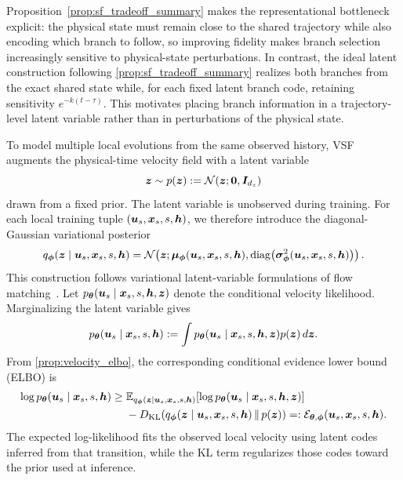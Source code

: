 \documentclass{article} %
\numberwithin{equation}{section}
\begin{document}
Proposition~\ref{prop:sf_tradeoff_summary} makes the representational
bottleneck explicit: the physical state must remain close to the shared
trajectory while also encoding which branch to follow, so improving fidelity
makes branch selection increasingly sensitive to physical-state perturbations.
In contrast, the ideal latent construction following
\cref{prop:sf_tradeoff_summary} realizes both branches from the
exact shared state while, for each fixed latent branch code, retaining
sensitivity $e^{-k(t-\tau)}$. This motivates placing branch information in a
trajectory-level latent variable rather than in perturbations of the physical
state.

To model multiple local evolutions from the same observed history, VSF
augments the physical-time velocity field with a latent variable
\begin{equation}
    {\bm{z}}\sim p({\bm{z}})
    :=
    \mathcal N({\bm{z}};{\bm{0}},{\bm{I}}_{d_z})
    \label{eq:latent_prior}
\end{equation}
drawn from a fixed prior. The latent variable is unobserved during training.
For each local training tuple $({\bm{u}}_s,{\bm{x}}_s,s,{\bm{h}})$, we therefore introduce
the diagonal-Gaussian variational posterior
\begin{equation}
    q_{\boldsymbol{\phi}}({\bm{z}}\mid{\bm{u}}_s,{\bm{x}}_s,s,{\bm{h}})
    =
    \mathcal N\!\left(
        {\bm{z}};
        {\bm{\mu}}_{\boldsymbol{\phi}}({\bm{u}}_s,{\bm{x}}_s,s,{\bm{h}}),
        \operatorname{diag}\!\left(
            \boldsymbol{\sigma}_{\boldsymbol{\phi}}^2({\bm{u}}_s,{\bm{x}}_s,s,{\bm{h}})
        \right)
    \right).
    \label{eq:vsf_variational_posterior}
\end{equation}
This construction follows variational latent-variable formulations of flow
matching~\citep{guo2025variational,eijkelboom2024variational}. Let
$p_{{\bm{\theta}}}({\bm{u}}_s\mid{\bm{x}}_s,s,{\bm{h}},{\bm{z}})$ denote the conditional velocity
likelihood. Marginalizing the latent variable gives
\begin{equation}
    p_{{\bm{\theta}}}({\bm{u}}_s\mid{\bm{x}}_s,s,{\bm{h}})
    :=
    \int
    p_{{\bm{\theta}}}({\bm{u}}_s\mid{\bm{x}}_s,s,{\bm{h}},{\bm{z}})
    p({\bm{z}})\,d{\bm{z}}.
    \label{eq:vsf_velocity_evidence}
\end{equation}
From \cref{prop:velocity_elbo}, the corresponding conditional evidence lower bound (ELBO) is
\begin{align}
    \log p_{{\bm{\theta}}}({\bm{u}}_s\mid{\bm{x}}_s,s,{\bm{h}})
    \geq{}&
    \mathbb{E}_{q_{\boldsymbol{\phi}}({\bm{z}}\mid{\bm{u}}_s,{\bm{x}}_s,s,{\bm{h}})}
    \!\left[
        \log p_{{\bm{\theta}}}({\bm{u}}_s\mid{\bm{x}}_s,s,{\bm{h}},{\bm{z}})
    \right]
    \notag\\
    &-
    D_{\mathrm{KL}}\!\left(
        q_{\boldsymbol{\phi}}({\bm{z}}\mid{\bm{u}}_s,{\bm{x}}_s,s,{\bm{h}})
        \,\Vert\,
        p({\bm{z}})
    \right)
    =:
    \mathcal E_{{\bm{\theta}},\boldsymbol{\phi}}({\bm{u}}_s,{\bm{x}}_s,s,{\bm{h}}).
    \label{eq:vsf_elbo}
\end{align}
The expected log-likelihood fits the observed local velocity using latent
codes inferred from that transition, while the KL term regularizes those
codes toward the prior used at inference.
\end{document}
